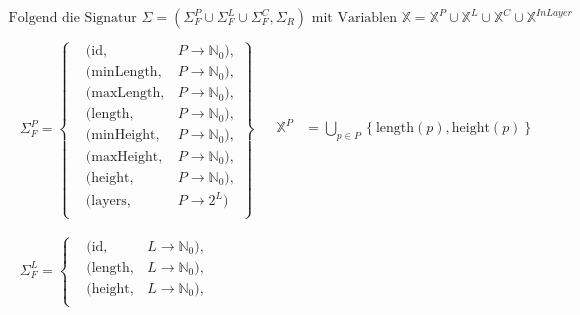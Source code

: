 \[
    \begin{aligned}
        \text{Folgend die Signatur } \Sigma = \left( \Sigma_{F}^{P} \cup \Sigma_{F}^{L} \cup \Sigma_{F}^{C}, \Sigma_{R} \right) \text{ mit Variablen } \mathbb{X} = \mathbb{X}^{P} \cup \mathbb{X}^{L} \cup \mathbb{X}^{C} \cup \mathbb{X}^{InLayer}  \\[5pt]
            \begin{array}{ll}
                \begin{aligned}
                    \Sigma_{F}^{P} = \left\{
                    \begin{aligned}
                        & (\text{id}, & P \rightarrow \mathbb{N}_0), \\
                        & (\text{minLength}, & P \rightarrow \mathbb{N}_0), \\
                        & (\text{maxLength}, & P \rightarrow \mathbb{N}_0), \\
                        & (\text{length}, & P \rightarrow \mathbb{N}_0), \\
                        & (\text{minHeight}, & P \rightarrow \mathbb{N}_0), \\
                        & (\text{maxHeight}, & P \rightarrow \mathbb{N}_0), \\
                        & (\text{height}, & P \rightarrow \mathbb{N}_0), \\
                        & (\text{layers}, & P \rightarrow 2^L)\; \\
                    \end{aligned} \right\} \\[5pt]
                \end{aligned}
                &
                \begin{aligned}
                    \mathbb{X}^{P} &= \bigcup_{p \in P} \left\{\text{length}(p), \text{height}(p) \right\} \\
                \end{aligned}
                \\
                \begin{aligned}
                    \Sigma_{F}^{L} = \left\{
                    \begin{aligned}
                        & (\text{id}, & L \rightarrow \mathbb{N}_0), \\
                        & (\text{length}, & L \rightarrow \mathbb{N}_0), \\
                        & (\text{height}, & L \rightarrow \mathbb{N}_0), \\

\end{aligned}
\end{aligned}
\end{array}
\end{aligned}\]
